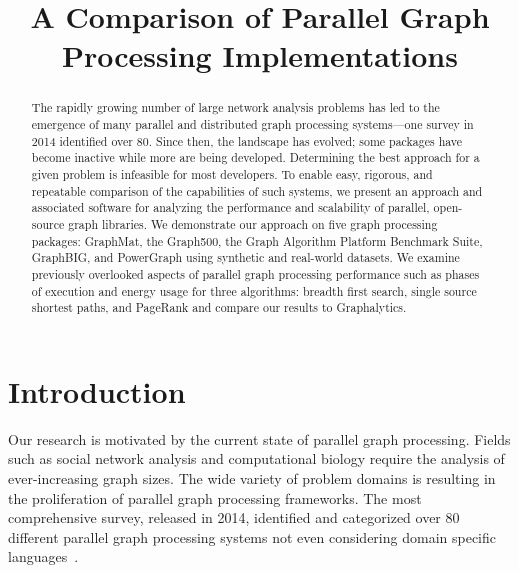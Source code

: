 \documentclass[conference]{IEEEtran}
\begin{document}
\title{A Comparison of Parallel Graph Processing Implementations}
\author{
	\and
}
\maketitle
\begin{abstract}
The rapidly growing number of large network analysis problems has led to the emergence of many parallel and distributed graph processing systems---one survey in 2014 identified over 80. Since then, the landscape has evolved; some packages have become inactive while more are being developed. Determining the best approach for a given problem is infeasible for most developers. To enable easy, rigorous, and repeatable comparison of the capabilities of such systems, we present an approach and associated software for analyzing the performance and scalability of parallel, open-source graph libraries. We demonstrate our approach on five graph processing packages: GraphMat, the Graph500, the Graph Algorithm Platform Benchmark Suite, GraphBIG, and PowerGraph using synthetic and real-world datasets. We examine previously overlooked aspects of parallel graph processing performance such as phases of execution and energy usage for three algorithms: breadth first search, single source shortest paths, and PageRank and compare our results to Graphalytics.
\end{abstract}

\section{Introduction}
Our research is motivated by the current state of parallel graph processing. Fields such as social network analysis \cite{Kang:2011:BillionGraph} and computational biology \cite{Paylopoulos:2011:biograph} require the analysis of ever-increasing graph sizes. The wide variety of problem domains is resulting in the proliferation of parallel graph processing frameworks. The most comprehensive survey, released in 2014, identified and categorized over 80 different parallel graph processing systems not even considering domain specific languages~\cite{Doekemeijer:2015:GPFSurvey}. 
\end{document}
